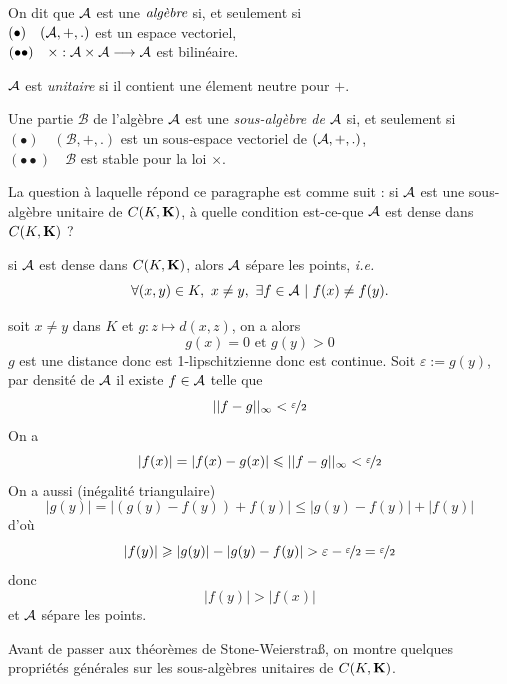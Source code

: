 \documentclass[a4paper,11pt, twoside]{article}
\begin{document}
\begin{Def}
  On dit que $\mathcal A$ est une $\emph{algèbre}$ si, et seulement si\\
  $(\bullet)\quad (\mathcal A,+,.)$ est un espace vectoriel,\\
  $(\bullet\bullet)\quad \times : \mathcal A\times\mathcal A\longrightarrow\mathcal A$ est bilinéaire.
\end{Def}


$\mathcal A$ est \emph{unitaire} si il contient une élement neutre pour $+$.


\begin{Def}
  Une partie $\mathcal B$ de l'algèbre $\mathcal A$ est une \emph{sous-algèbre de} $\mathcal A$ si, et seulement si\\
  $(\bullet)\quad (\mathcal B,+,.)$ est un sous-espace vectoriel de $(\mathcal A,+,.)$,\\
  $(\bullet\bullet)\quad \mathcal B$ est stable pour la loi $\times$.\\
\end{Def}

La question à laquelle répond ce paragraphe est comme suit : si $\mathcal A$ est une sous-algèbre unitaire de $C(K,\mathbf K)$, à quelle condition est-ce-que $\mathcal A$ est dense dans $C(K,\mathbf K)$ ?\\[1em]


\begin{RQ}
  si $\mathcal A$ est dense dans $C(K,\mathbf K)$, alors $\mathcal A$ sépare les points, \emph{i.e.}
  $$\forall (x,y)\in K,\ x\neq y,\ \exists f\in\A\ |\ f(x)\neq f(y).$$
\end{RQ}


\begin{Proof}
  soit $x\neq y$ dans $K$ et $g:z\longmapsto d(x,z)$, on a alors 
  $$g(x)=0\text{ et }g(y)>0$$
  $g$ est une distance donc est 1-lipschitzienne donc est continue. Soit $\varepsilon:=g(y)$, par densité de $\mathcal A$ il existe $f\in \mathcal A$ telle que 
  $$||f-g||_{\infty}<\displaystyle\nicefrac{\varepsilon}{2}$$
  On a 
  $$|f(x)|=|f(x)-g(x)|\leqslant||f-g||_{\infty}<\displaystyle\nicefrac{\varepsilon}{2}$$
  On a aussi (inégalité triangulaire)
  $$|g(y)|=|(g(y)-f(y))+f(y)|\leqslant|g(y)-f(y)|+|f(y)|$$
  d'où
  $$|f(y)|\geqslant |g(y)|-|g(y)-f(y)|>\varepsilon-\dstyle\nicefrac{\varepsilon}{2}=\dstyle\nicefrac{\varepsilon}{2}$$
  donc 
  $$|f(y)|>|f(x)|$$
  et $\mathcal A$ sépare les points.
\end{Proof}


Avant de passer aux théorèmes de Stone-Weierstra\ss, on montre quelques propriétés générales sur les sous-algèbres unitaires de $C(K,\mathbf K)$.
\end{document}
